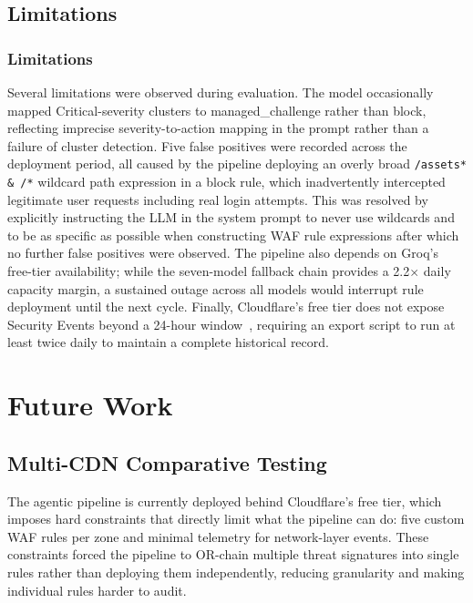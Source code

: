 \documentclass[12pt, a4paper]{report}   %
\begin{document}
\section{Limitations}
\label{sec:pipeline-limitations}

\subsection{Limitations}

Several limitations were observed during evaluation. The model occasionally 
mapped Critical-severity clusters to managed\_challenge rather than block, 
reflecting imprecise severity-to-action mapping in the prompt rather than a 
failure of cluster detection. Five false positives were recorded across the 
deployment period, all caused by the pipeline deploying an overly broad 
\texttt{/assets* & /*} wildcard path expression in a block rule, which inadvertently 
intercepted legitimate user requests including real login attempts. This was 
resolved by explicitly instructing the LLM in the system prompt to never use 
wildcards and to be as specific as possible when constructing WAF rule 
expressions after which no further false positives were observed. The 
pipeline also depends on Groq's free-tier availability; while the seven-model 
fallback chain provides a 2.2$\times$ daily capacity margin, a sustained outage 
across all models would interrupt rule deployment until the next cycle. Finally, 
Cloudflare's free tier does not expose Security Events beyond a 24-hour 
window~\cite{cf-ddos}, requiring an export script to run at least twice daily 
to maintain a complete historical record.

\chapter{Future Work}
\label{sec:future-work}

\section{Multi-CDN Comparative Testing}

The agentic pipeline is currently deployed behind Cloudflare's 
free tier, which imposes hard constraints that directly limit 
what the pipeline can do: five custom WAF rules per zone and 
minimal telemetry for network-layer events. These constraints 
forced the pipeline to OR-chain multiple threat signatures into 
single rules rather than deploying them independently, reducing 
granularity and making individual rules harder to audit.
\end{document}
